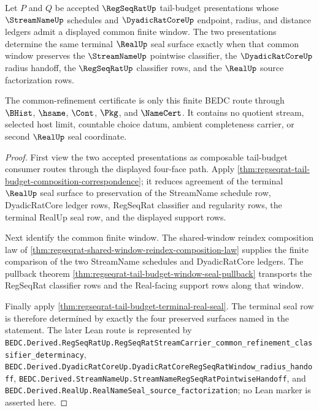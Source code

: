 \begin{theorem}
\label{thm:regseqrat-dyadic-stream-tail-budget-common-refinement}
Let $P$ and $Q$ be accepted $\RegSeqRatUp$ tail-budget presentations whose
$\StreamNameUp$ schedules and $\DyadicRatCoreUp$ endpoint, radius, and distance
ledgers admit a displayed common finite window. The two presentations determine
the same terminal $\RealUp$ seal surface exactly when that common window
preserves the $\StreamNameUp$ pointwise classifier, the $\DyadicRatCoreUp$
radius handoff, the $\RegSeqRatUp$ classifier rows, and the $\RealUp$ source
factorization rows.

The common-refinement certificate is only this finite BEDC route through
$\BHist$, $\hsame$, $\Cont$, $\Pkg$, and $\NameCert$. It contains no quotient
stream, selected host limit, countable choice datum, ambient completeness
carrier, or second $\RealUp$ seal coordinate.
\end{theorem}
\begin{proof}
First view the two accepted presentations as composable tail-budget consumer
routes through the displayed four-face path. Apply
\autoref{thm:regseqrat-tail-budget-composition-correspondence}; it reduces
agreement of the terminal $\RealUp$ seal surface to preservation of the
StreamName schedule row, DyadicRatCore ledger rows, RegSeqRat classifier and
regularity rows, the terminal RealUp seal row, and the displayed support rows.

Next identify the common finite window. The shared-window reindex composition
law of \autoref{thm:regseqrat-shared-window-reindex-composition-law} supplies
the finite comparison of the two StreamName schedules and DyadicRatCore ledgers.
The pullback theorem
\autoref{thm:regseqrat-tail-budget-window-seal-pullback} transports the
RegSeqRat classifier rows and the Real-facing support rows along that window.

Finally apply \autoref{thm:regseqrat-tail-budget-terminal-real-seal}. The
terminal seal row is therefore determined by exactly the four preserved
surfaces named in the statement. The later Lean route is represented by
\texttt{BEDC.Derived.RegSeqRatUp.RegSeqRatStreamCarrier\_common\_refinement\_classifier\_determinacy},
\texttt{BEDC.Derived.DyadicRatCoreUp.DyadicRatCoreRegSeqRatWindow\_radius\_handoff},
\texttt{BEDC.Derived.StreamNameUp.StreamNameRegSeqRatPointwiseHandoff}, and
\texttt{BEDC.Derived.RealUp.RealNameSeal\_source\_factorization}; no Lean marker
is asserted here.
\end{proof}

